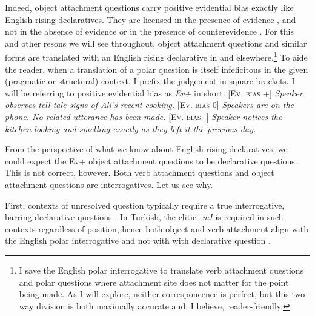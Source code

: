 \documentclass[output=paper,colorlinks,citecolor=brown]{langscibook}
\begin{document}
Indeed, object attachment questions carry positive evidential bias exactly like English rising declaratives.  They are licensed  in the presence of evidence , and not in the absence of evidence  or in the presence of counterevidence . For this and other resons we will see throughout, object attachment questions and similar forms are translated with an English rising declarative in  and elsewhere.\footnote{I save the English polar interrogative to translate verb attachment questions and polar questions where attachment site does not matter for the point being made. As I will explore, neither corresponcence is perfect, but this two-way division is both maximally accurate and, I believe, reader-friendly.} To aide the reader, when a translation of a polar question is itself infelicitous in the given (pragmatic or structural) context, I prefix the judgement in square brackets. I will be referring to positive evidential bias as \textit{Ev+} in short.
\ea\label{ex:11:8}
\ea\label{ex:11:8a} \textsc{[Ev. bias +]} \textit{Speaker observes tell-tale signs of Ali's recent cooking.}
\ex\label{ex:11:8b} \textsc{[Ev. bias 0]} \textit{Speakers are on the phone. No related utterance has been made.}
\ex\label{ex:11:8c} \textsc{$[$Ev. bias -]} \textit{Speaker notices the kitchen looking and smelling exactly as they left it the previous day.}
\z
\z

From the perspective of what we know about English rising declaratives, we could expect the Ev+ object attachment questions to be declarative questions. This is not correct, however. Both verb attachment questions and object attachment questions are interrogatives. Let us see why.

\largerpage[2]
First,  contexts of unresolved question typically require a true interrogative, barring declarative questions \citep{gunlogson} .  In Turkish, the clitic \textit{-mI} is required in such contexts regardless of position, hence both object and verb attachment align with the English polar interrogative and not with with declarative question .
\ea\label{ex:11:9}
\label{ex:11:9a}
\label{ex:11:9b}
\z
\z
\end{document}
